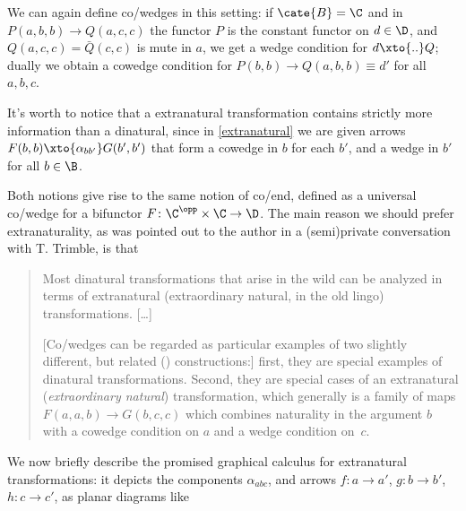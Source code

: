 \begin{remark}
We can again define co/wedges in this setting: if $\cate{B}=\C$ and in $P(a,b,b)\to Q(a,c,c)$ the functor $P$ is the constant functor on $d\in\D$, and $Q(a,c,c)=\bar Q(c,c)$ is mute in $a$, we get a wedge condition for $d\xto{..}Q$; dually we obtain a cowedge condition for $P(b,b)\to Q(a,b,b)\equiv d'$ for all $a,b,c$. 

It's worth to notice that a extranatural transformation contains strictly more information than a dinatural, since in \adef\ref{extranatural} we are given arrows $F(b,b) \xto{\alpha_{bb'}} G(b',b')$ that form a cowedge in $b$ for each $b'$, and a wedge in $b'$ for all $b\in\B$.
\end{remark}
Both notions give rise to the same notion of co/end, defined as a universal co/wedge for a bifunctor $F\colon \C^\opp\times\C\to \D$. The main reason we should prefer extranaturality, as was pointed out to the author in a (semi)private conversation with T\@. Trimble, is that
\begin{quote}
\small 
Most dinatural transformations that arise in the wild can be analyzed in terms of extranatural (extraordinary natural, in the old lingo) transformations. [\dots]

[Co/wedges can be regarded as particular examples of two slightly different, but related (\aprop {}) constructions:] first, they are special examples of dinatural transformations. Second, they are special cases of an extranatural (\emph{extraordinary natural}) transformation, which generally is a family of maps $F(a, a, b) \to G(b, c, c)$ which combines naturality in the argument $b$ with a cowedge condition on $a$ and a wedge condition on~$c$.
\end{quote}
We now briefly describe the promised graphical calculus for extranatural transformations: it depicts the components $\alpha_{abc}$, and arrows $f\colon a\to a'$, $g\colon b\to b'$, $h\colon c\to c'$, as planar diagrams like

